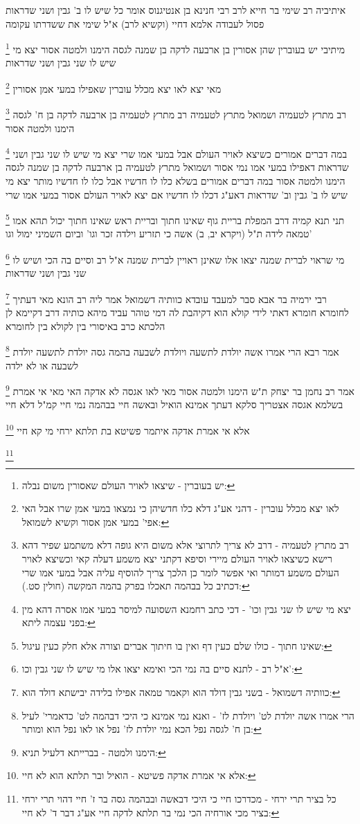 \documentclass[12pt, openany]{book}
\newcommand{\footnotecomment}[1]{
	\renewcommand\thefootnote{}
	\footnote{#1}}
\newcommand{\commenta}[1]{\footnotecomment{#1}}
\begin{document}
{איתיביה רב שימי בר חייא לרב רבי חנינא בן אנטיגנוס אומר כל שיש לו ב' גבין ושני שדראות פסול לעבודה אלמא דחיי (וקשיא לרב) א"ל שימי את ששדרתו עקומה 
\commenta{יש בעוברין - שיצאו לאויר העולם שאסורין משום נבלה:}
מיתיבי יש בעוברין שהן אסורין בן ארבעה לדקה בן שמנה לגסה הימנו ולמטה אסור יצא מי שיש לו שני גבין ושני שדראות 
\commenta{לאו יצא מכלל עוברין - דהני אע"ג דלא כלו חדשיהן כי נמצאו במעי אמן שרו אבל האי אפי' במעי אמן אסור וקשיא לשמואל:}
מאי יצא לאו יצא מכלל עוברין שאפילו במעי אמן אסורין 
\commenta{רב מתרץ לטעמיה - דרב לא צריך לתרוצי אלא משום היא גופה דלא משתמע שפיר דהא רישא כשיצאו לאויר העולם מיירי וסיפא דקתני יצא משמע דעלה קאי וכשיצא לאויר העולם משמע דמותר ואי אפשר לומר כן הלכך צריך להוסיף עליה אבל במעי אמו שרי דכתיב כל בבהמה תאכלו בפרק בהמה המקשה (חולין סט.):}
רב מתרץ לטעמיה ושמואל מתרץ לטעמיה רב מתרץ לטעמיה בן ארבעה לדקה בן ח' לגסה הימנו ולמטה אסור 
\commenta{יצא מי שיש לו שני גבין וכו' - דכי כתב רחמנא השסועה למיסר במעי אמו אסרה דהא מין בפני עצמה ליתא:}
במה דברים אמורים כשיצא לאויר העולם אבל במעי אמו שרי יצא מי שיש לו שני גבין ושני שדראות דאפילו במעי אמו נמי אסור
ושמואל מתרץ לטעמיה בן ארבעה לדקה בן שמנה לגסה הימנו ולמטה אסור במה דברים אמורים בשלא כלו לו חדשיו אבל כלו לו חדשיו מותר יצא מי שיש לו ב' גבין וב' שדראות דאע"ג דכלו לו חדשיו אם יצא לאויר העולם אסור במעי אמו שרי 
\commenta{שאינו חתוך - כולו שלם כעין דף ואין בו חיתוך אברים וצורה אלא חלק כעין עיגול:}
תני תנא קמיה דרב המפלת בריית גוף שאינו חתוך ובריית ראש שאינו חתוך יכול תהא אמו טמאה לידה ת"ל (ויקרא יב, ב) אשה כי תזריע וילדה זכר וגו' וביום השמיני ימול וגו'
\commenta{א"ל רב - לתנא סיים בה נמי הכי ואימא יצאו אלו מי שיש לו שני גבין וכו':}
מי שראוי לברית שמנה יצאו אלו שאינן ראויין לברית שמנה א"ל רב וסיים בה הכי ושיש לו שני גבין ושני שדראות 
\commenta{כוותיה דשמואל - בשני גבין דולד הוא וקאמר טמאה אפילו בלידה יבישתא דולד הוא:}
רבי ירמיה בר אבא סבר למעבד עובדא כוותיה דשמואל אמר ליה רב הונא מאי דעתיך לחומרא חומרא דאתי לידי קולא הוא דקיהבת לה דמי טוהר עביד מיהא כותיה דרב דקיימא לן הלכתא כרב באיסורי בין לקולא בין לחומרא 
\commenta{הרי אמרו אשה יולדת לט' ויולדת לז' - ואנא נמי אמינא כי היכי דבהמה לט' כדאמרי' לעיל בן ח' לגסה נפל הכא נמי יולדת לז' נפל או לאו נפל הוא ומותר:}
אמר רבא הרי אמרו אשה יולדת לתשעה ויולדת לשבעה בהמה גסה יולדת לתשעה יולדת לשבעה או לא ילדה 
\commenta{הימנו ולמטה - בברייתא דלעיל תניא:}
אמר רב נחמן בר יצחק ת"ש הימנו ולמטה אסור מאי לאו אגסה לא אדקה 
האי מאי אי אמרת בשלמא אגסה אצטריך סלקא דעתך אמינא הואיל ובאשה חיי בבהמה נמי חיי קמ"ל דלא חיי 
\commenta{אלא אי אמרת אדקה פשיטא - הואיל ובר תלתא הוא לא חיי:}
אלא אי אמרת אדקה איתמר פשיטא בת תלתא ירחי מי קא חיי 
\commenta{כל בציר תרי ירחי - מכדרכו חיי כי היכי דבאשה ובבהמה גסה בר ז' חיי דהוי תרי ירחי בציר מכי אורחיה הכי נמי בר תלתא לדקה חיי אע"ג דבר ד' לא חיי:}
}
\end{document}
